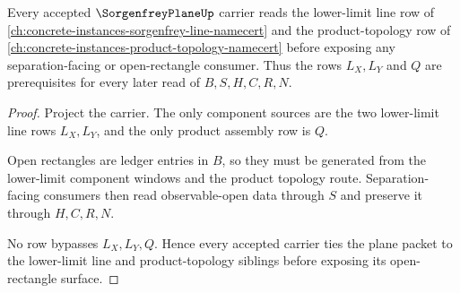 \begin{theorem}
\label{thm:sorgenfrey-plane-product-topology-link}
Every accepted $\SorgenfreyPlaneUp$ carrier reads the lower-limit line row of \autoref{ch:concrete-instances-sorgenfrey-line-namecert} and the product-topology row of \autoref{ch:concrete-instances-product-topology-namecert} before exposing any separation-facing or open-rectangle consumer. Thus the rows $L_X,L_Y$ and $Q$ are prerequisites for every later read of $B,S,H,C,R,N$.
\end{theorem}
\begin{proof}
Project the carrier. The only component sources are the two lower-limit line rows $L_X,L_Y$, and the only product assembly row is $Q$.

Open rectangles are ledger entries in $B$, so they must be generated from the lower-limit component windows and the product topology route. Separation-facing consumers then read observable-open data through $S$ and preserve it through $H,C,R,N$.

No row bypasses $L_X,L_Y,Q$. Hence every accepted carrier ties the plane packet to the lower-limit line and product-topology siblings before exposing its open-rectangle surface.
\end{proof}

